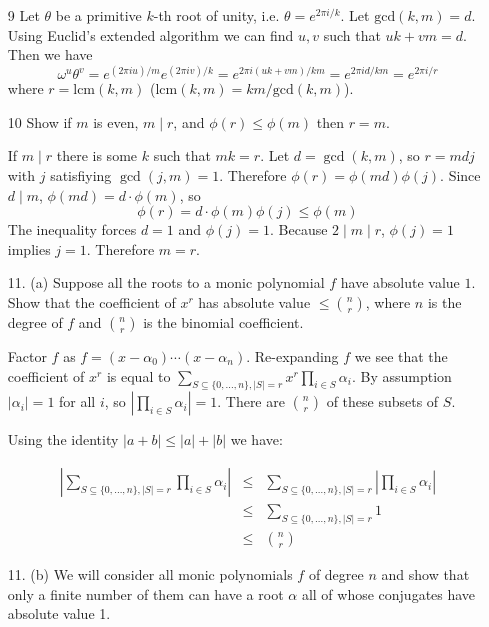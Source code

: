 \documentclass{article}
\newcommand{\w}[0]{\omega}
\begin{document}
\begin{enumerate}
\item[9] Let $\theta$ be a primitive $k$-th root of unity, i.e. $\theta = e^{2\pi i / k}$.  Let $\text{gcd}(k, m) = d$.  Using Euclid's extended algorithm we can find $u, v$ such that $uk + vm = d$.  Then we have
\[ \w^u \theta^v = e^{(2\pi i u)/m} e^{(2\pi i v) / k} = e^{2\pi i (uk + vm) / km} = e^{2\pi i d / km} = e^{2\pi i / r} \]
where $r = \text{lcm}(k, m)$ ($\text{lcm}(k, m) = km / \text{gcd}(k, m)$).

\item[10] Show if $m$ is even, $m \mid r$, and $\phi(r) \le \phi(m)$ then $r = m$.

If $m \mid r$ there is some $k$ such that $mk = r$.  Let $d = \gcd(k, m)$, so $r = mdj$ with $j$ satisfiying $\gcd(j, m) = 1$.  Therefore $\phi(r) = \phi(md)\phi(j)$.  Since $d \mid m$, $\phi(md) = d \cdot \phi(m)$, so \[ \phi(r) = d \cdot \phi(m)\phi(j) \le \phi(m) \]  The inequality forces $d = 1$ and $\phi(j) = 1$.  Because $2 \mid m \mid r$, $\phi(j) = 1$ implies $j = 1$.  Therefore $m = r$.

\item[11. (a)] Suppose all the roots to a monic polynomial $f$ have absolute value $1$.  Show that the coefficient of $x^r$ has absolute value $\le \binom{n}{r}$, where $n$ is the degree of $f$ and $\binom{n}{r}$ is the binomial coefficient.

Factor $f$ as $f = (x - \alpha_0) \cdots (x - \alpha_n)$.  Re-expanding $f$ we see that the coefficient of $x^r$ is equal to $\sum_{S \subseteq \{0, \ldots, n\}, |S| = r} x^r \prod_{i \in S} \alpha_i$.  By assumption $|\alpha_i| = 1$ for all $i$, so $|\prod_{i \in S} \alpha_i| = 1$.  There are $\binom{n}{r}$ of these subsets of $S$.

Using the identity $|a + b| \le |a| + |b|$ we have:

\begin{eqnarray*}
    \left|\sum_{S \subseteq \{0, \ldots, n\}, |S| = r} \prod_{i \in S} \alpha_i \right| &\le& \sum_{S \subseteq \{0, \ldots, n\}, |S| = r} | \prod_{i \in S} \alpha_i | \\
    &\le& \sum_{S \subseteq \{0, \ldots, n\}, |S| = r} 1 \\
    &\le& \binom{n}{r}
\end{eqnarray*}

\item[11. (b)] We will consider all monic polynomials $f$ of degree $n$ and show that only a finite number of them can have a root $\alpha$ all of whose conjugates have absolute value 1.


\end{enumerate}
\end{document}
